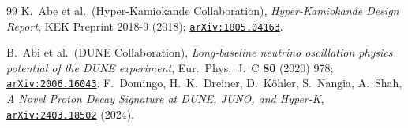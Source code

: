 \documentclass[a4paper,11pt]{article}
\newcommand{\arXiv}[1]{\href{https://arxiv.org/abs/#1}{\texttt{arXiv:#1}}}
\theoremstyle{definition}
\theoremstyle{remark}
\begin{document}
\begin{thebibliography}{99}
K.~Abe et al.\ (Hyper-Kamiokande Collaboration),
\emph{Hyper-Kamiokande Design Report},
KEK Preprint 2018-9 (2018);
\arXiv{1805.04163}.

B.~Abi et al.\ (DUNE Collaboration),
\emph{Long-baseline neutrino oscillation physics potential of the
DUNE experiment},
Eur.~Phys.~J.~C \textbf{80} (2020) 978;
\arXiv{2006.16043}.
F.~Domingo, H.~K.~Dreiner, D.~K\"ohler, S.~Nangia, A.~Shah,
\emph{A Novel Proton Decay Signature at DUNE, JUNO, and Hyper-K},
\arXiv{2403.18502} (2024).

\end{thebibliography}
\end{document}
